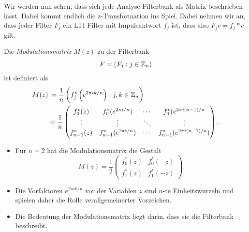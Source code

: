 Wir werden nun sehen, dass sich jede Analyse-Filterbank als Matrix beschrieben lässt. Dabei kommt
endlich die z-Transformation ins Spiel. Dabei nehmen wir an, dass jeder Filter $ F_{j} $ ein
LTI-Filter mit Impulsantwort $ f_{j} $ ist, dass also $ F_{j}c = f_{j} * c $ gilt.

\begin{definition}[Modulationsmatrix]
Die \emph{Modulationsmatrix} $ M(z) $ zu der Filterbank
\[
  F = (F_{j} : j \in \mathbb{Z}_{n})
\]
ist definiert als
\begin{align*}
   M(z)
  &\coloneqq \frac{1}{n} \left( f_{j}^{*} \left( e^{2\pi ik/n} \right) : j,k \in \mathbb{Z}_{n} \right) \\
  &= \frac{1}{n} \begin{pmatrix}
    f_{0}^{*}(z) & f_{0}^{*}(e^{2\pi i/n}) & \cdots & f_{0}^{*}(e^{2\pi i(n-1)/n} \\
    \vdots & \vdots & \ddots & \vdots \\
    f_{n-1}^{*}(z) & f_{n-1}^{*}(e^{2\pi i/n}) & \cdots & f_{n-1}^{*}(e^{2\pi i(n-1)/n})
  \end{pmatrix}.
\end{align*}
\end{definition}

\begin{remark}[Modulationsmatrix] \leavevmode
\begin{itemize}
\item Für $ n = 2 $ hat die Modulationsmatrix die Gestalt
  \[
    M(z) = \frac{1}{2}
    \begin{pmatrix}
      f_{0}^{*}(z) & f_{0}^{*}(-z) \\
      f_{1}^{*}(z) & f_{1}^{*}(-z)
    \end{pmatrix}.
  \]
\item Die Vorfaktoren $ e^{2\pi ik/n} $ vor der Variablen $ z $ sind $ n $-te Einheitswurzeln und
  spielen daher die Rolle verallgemeinerter Vorzeichen.
\item Die Bedeutung der Modulationsmatrix liegt darin, dass sie die Filterbank beschreibt.
\end{itemize}
\end{remark}

